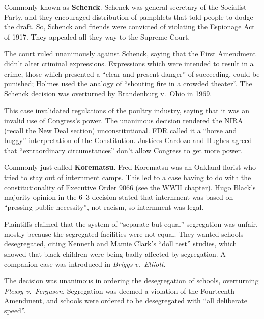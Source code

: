 
Commonly known as \textbf{Schenck}.
Schenck was general secretary of the Socialist Party,
and they encouraged distribution of pamphlets that told people to dodge the draft.
So, Schenck and friends were convicted of violating the Espionage Act of 1917.
They appealed all they way to the Supreme Court.

The court ruled unanimously against Schenck, saying that the First Amendment didn't alter criminal expressions.
Expressions which were intended to result in a crime,
those which presented a ``clear and present danger'' of succeeding, could be punished;
Holmes used the analogy of ``shouting fire in a crowded theater''.
The Schenck decision was overturned by Brandenburg v.\ Ohio in 1969.


This case invalidated regulations of the poultry industry, saying that it was an invalid use of Congress's power.
The unanimous decision rendered the NIRA (recall the New Deal section) unconstitutional.
FDR called it a ``horse and buggy'' interpretation of the Constitution.
Justices Cardozo and Hughes agreed that ``extraordinary circumstances'' don't allow Congress to get more power.


Commonly just called \textbf{Korematsu}.
Fred Korematsu was an Oakland florist who tried to stay out of internment camps.
This led to a case having to do with the constitutionality of Executive Order 9066 (see the WWII chapter).
Hugo Black's majority opinion in the 6--3 decision stated that internment was based
on ``pressing public necessity'', not racism, so internment was legal.


Plaintiffs claimed that the system of ``separate but equal'' segregation was unfair,
mostly because the segregated facilities were not equal.
They wanted schools desegregated,
citing Kenneth and Mamie Clark's ``doll test'' studies,
which showed that black children were being badly affected by segregation.
A companion case was introduced in \textit{Briggs v.\ Elliott}.

The decision was unanimous in ordering the desegregation of schools, overturning \textit{Plessy v.\ Ferguson}.
Segregation was deemed a violation of the Fourteenth Amendment,
and schools were ordered to be desegregated with ``all deliberate speed''.

